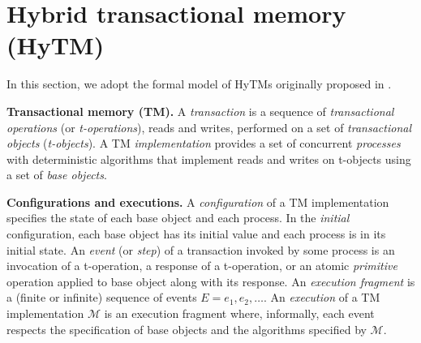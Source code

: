 \section{Hybrid transactional memory (HyTM)}
\label{sec:hytm}
%
In this section, we adopt the formal model of HyTMs originally proposed in \cite{htmdisc15}.

\vspace{1mm}\noindent\textbf{Transactional memory (TM).} 
A \emph{transaction} is a sequence of \emph{transactional operations}
(or \emph{t-operations}), reads and writes, performed on a set of \emph{transactional objects} 
(\emph{t-objects}). 
A TM \emph{implementation} provides a set of
concurrent \emph{processes} with deterministic algorithms that implement reads and
writes on t-objects using  a set of \emph{base objects}.

\vspace{1mm}\noindent\textbf{Configurations and executions.} 
A \emph{configuration} of a TM implementation specifies the state of each base object and each process. 
In the \emph{initial} configuration, each base object has its initial value and each process is in its initial state. 
An \emph{event} (or \emph{step}) of a transaction invoked by some process is an invocation of a t-operation, 
a response of a t-operation, or an atomic \emph{primitive} operation applied to base object along with its response. 
An \emph{execution fragment} is a (finite or infinite) sequence of events $E = e_1,e_2,\dots$. 
An \emph{execution} of a TM implementation $\mathcal{M}$ is an
execution fragment where, informally, each event respects the
specification of base objects and the algorithms specified by $\mathcal{M}$.

